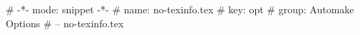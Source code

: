 # -*- mode: snippet -*-
# name: no-texinfo.tex
# key: opt
# group: Automake Options
# --
no-texinfo.tex